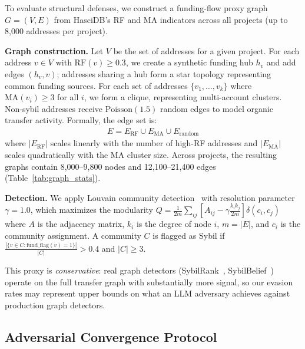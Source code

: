 \documentclass[sigconf,nonacm=false]{acmart}
\begin{document}
To evaluate structural defenses, we construct a funding-flow proxy graph $G = (V, E)$ from HasciDB's RF and MA indicators across all \largeScaleNProjects{} projects (up to 8,000 addresses per project).

\noindent\textbf{Graph construction.}
Let $V$ be the set of addresses for a given project.
For each address $v \in V$ with $\text{RF}(v) \ge 0.3$, we create a synthetic funding hub $h_v$ and add edges $(h_v, v)$; addresses sharing a hub form a star topology representing common funding sources.
For each set of addresses $\{v_1, \ldots, v_k\}$ where $\text{MA}(v_i) \ge 3$ for all $i$, we form a clique, representing multi-account clusters.
Non-sybil addresses receive $\text{Poisson}(1.5)$ random edges to model organic transfer activity.
Formally, the edge set is:
\begin{align}
E = E_{\text{RF}} \cup E_{\text{MA}} \cup E_{\text{random}}
\end{align}
where $|E_{\text{RF}}|$ scales linearly with the number of high-RF addresses and $|E_{\text{MA}}|$ scales quadratically with the MA cluster size.
Across \largeScaleNProjects{} projects, the resulting graphs contain 8,000--9,800 nodes and 12,100--21,400 edges (Table~\ref{tab:graph_stats}).

\noindent\textbf{Detection.}
We apply Louvain community detection~\cite{blondel2008louvain} with resolution parameter $\gamma{=}1.0$, which maximizes the modularity $Q = \frac{1}{2m}\sum_{ij}\left[A_{ij} - \gamma\frac{k_ik_j}{2m}\right]\delta(c_i, c_j)$ where $A$ is the adjacency matrix, $k_i$ is the degree of node $i$, $m = |E|$, and $c_i$ is the community assignment.
A community $C$ is flagged as Sybil if $\frac{|\{v \in C : \text{fund\_flag}(v)=1\}|}{|C|} > 0.4$ and $|C| \ge 3$.

This proxy is \textit{conservative}: real graph detectors (SybilRank~\cite{cao2012sybilrank}, SybilBelief~\cite{gong2014sybilbelief}) operate on the full transfer graph with substantially more signal, so our evasion rates may represent upper bounds on what an LLM adversary achieves against production graph detectors.

\subsection{Adversarial Convergence Protocol}
\label{sec:methods:equilibrium}
\end{document}

